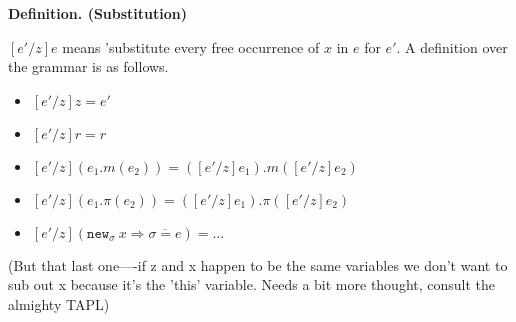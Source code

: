 \documentclass{llncs}
\newcommand{\keywadj}[1]{\mathtt{#1}}
\newcommand{\keyw}[1]{\keywadj{#1}~}
\newcommand{\thm}[3]{
	\begin{large}
		\bf{#1}
	\end{large} \\\\
	\fbox{Statement.} ~ #2
	\fbox{Proof.}~ #3 \qed
}
\begin{document}

\begin{large}
	\bf{Definition. (Substitution)}
\end{large}

$[e'/z]e$ means 'substitute every free occurrence of $x$ in $e$ for $e'$. A definition over the grammar is as follows.

\begin{itemize}
	\item $[e'/z]z = e'$
	\item $[e'/z]r = r$
	\item $[e'/z](e_1.m(e_2)) = ([e'/z]e_1).m([e'/z]e_2)$
	\item $[e'/z](e_1.\pi(e_2)) = ([e'/z]e_1).\pi([e'/z]e_2)$
	\item $[e'/z](\keyw{new_\sigma} x \Rightarrow \overline {\sigma = e}) = ...$
\end{itemize}

(But that last one----if z and x happen to be the same variables we don't want to sub out x because it's the 'this' variable. Needs a bit more thought, consult the almighty TAPL) \\
\end{document}
